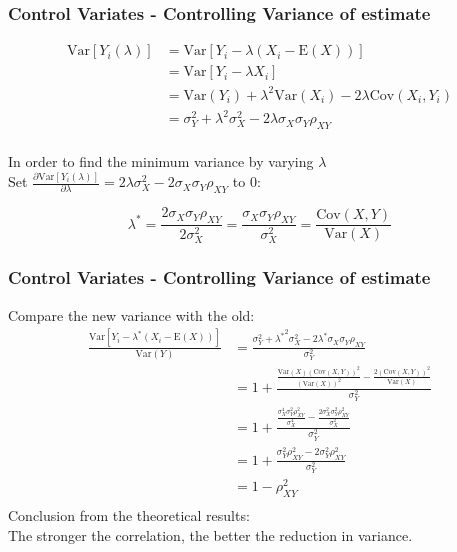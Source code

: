 \documentclass{beamer}
\begin{document}
\begin{frame}
\frametitle{Control Variates - Controlling Variance of estimate}
\begin{equation*}
\begin{split}
\mathrm{Var}[Y_{i}(\lambda)]
&=\mathrm{Var} [Y_{i} - \lambda(X_{i} - \mathrm{E}(X))] \\
&= \mathrm{Var}[Y_{i} - \lambda X_{i}] \\
&= \mathrm{Var}(Y_{i}) + \lambda^{2}\mathrm{Var}(X_{i}) - 2\lambda\mathrm{Cov}(X_{i}, Y_{i}) \\
&= \sigma_{Y}^{2} + \lambda^{2}\sigma_{X}^{2}-2\lambda\sigma_{X}\sigma_{Y}\rho_{XY}\\
\end{split}
\end{equation*}
\begin{center}
In order to find the minimum variance by varying $\lambda$\\[2mm]
Set $\frac{\partial \mathrm{Var}[Y_{i}(\lambda)]}{\partial \lambda} = 2\lambda \sigma_{X}^{2} - 2\sigma_{X}\sigma_{Y}\rho_{XY}$ to 0:
\end{center}
$$ \lambda^{*} = \frac{2\sigma_{X}\sigma_{Y}\rho_{XY}}{2\sigma_{X}^{2}} = \frac{\sigma_{X}\sigma_{Y}\rho_{XY}}{\sigma_{X}^{2}} = \frac{\mathrm{Cov}(X,Y)}{\mathrm{Var}(X)}$$
\end{frame}

\begin{frame}
\frametitle{Control Variates - Controlling Variance of estimate}
Compare the new variance with the old:
\begin{equation*}
\begin{split}
\frac{\mathrm{Var} [Y_{i} - \lambda^{*}(X_{i} - \mathrm{E}(X))]}{\mathrm{Var}(Y)}
&=\frac{\sigma_{Y}^{2} + {\lambda^{*}}^{2}\sigma_{X}^{2}-2\lambda^{*}\sigma_{X}\sigma_{Y}\rho_{XY}}{\sigma_{Y}^{2}} \\
&=1+\frac{\frac{\mathrm{Var}(X)(\mathrm{Cov}(X,Y))^{2}}{(\mathrm{Var}(X))^{2}}-\frac{2(\mathrm{Cov}(X,Y))^{2}}{\mathrm{Var}(X)}}{\sigma_{Y}^{2}}\\
&=1+\frac{\frac{\sigma_{X}^{4}\sigma_{Y}^{2}\rho_{XY}^{2}}{\sigma_{X}^{4}}-\frac{2\sigma_{X}^{2}\sigma_{Y}^{2}\rho_{XY}^{2}}{\sigma_{X}^{2}}}{\sigma_{Y}^{2}}\\
&=1+\frac{\sigma_{Y}^{2}\rho_{XY}^{2}-2\sigma_{Y}^{2}\rho_{XY}^{2}}{\sigma_{Y}^{2}}\\
&=1-\rho_{XY}^{2}\\
\end{split}
\end{equation*}
Conclusion from the theoretical results:\\
The stronger the correlation, the better the reduction in variance.
\end{frame}
\end{document}
